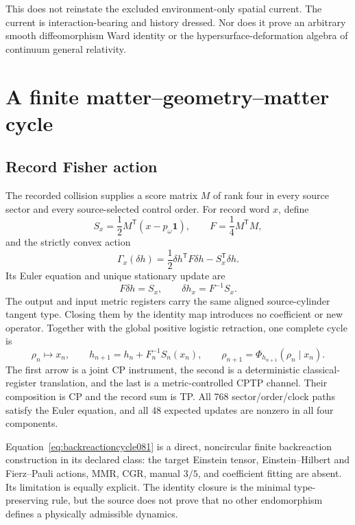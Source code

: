 \documentclass[11pt]{article}
\theoremstyle{definition}
\theoremstyle{remark}
\begin{document}
This does not reinstate the excluded environment-only spatial current. The current is interaction-bearing and history dressed. Nor does it prove an arbitrary smooth diffeomorphism Ward identity or the hypersurface-deformation algebra of continuum general relativity.

\section{A finite matter--geometry--matter cycle}\label{sec:finitebackreaction081}

\subsection{Record Fisher action}

The recorded collision supplies a score matrix $M$ of rank four in every source sector and every source-selected control order. For record word $x$, define
\begin{equation}
 S_x=\frac12M^{\mathsf T}(x-p_\omega\mathbf 1),
 \qquad
 F=\frac14M^{\mathsf T}M,
\end{equation}
and the strictly convex action
\begin{equation}\label{eq:fisheraction081}
 \Gamma_x(\delta h)
 =\frac12\delta h^{\mathsf T}F\delta h-S_x^{\mathsf T}\delta h.
\end{equation}
Its Euler equation and unique stationary update are
\begin{equation}\label{eq:fisherupdate081}
 F\delta h=S_x,
 \qquad
 \delta h_x=F^{-1}S_x.
\end{equation}
The output and input metric registers carry the same aligned source-cylinder tangent type. Closing them by the identity map introduces no coefficient or new operator. Together with the global positive logistic retraction, one complete cycle is
\begin{equation}\label{eq:backreactioncycle081}
 \rho_n\longmapsto x_n,
 \qquad
 h_{n+1}=h_n+F_n^{-1}S_n(x_n),
 \qquad
 \rho_{n+1}=\Phi_{h_{n+1}}(\rho_n\mid x_n).
\end{equation}
The first arrow is a joint CP instrument, the second is a deterministic classical-register translation, and the last is a metric-controlled CPTP channel. Their composition is CP and the record sum is TP. All 768 sector/order/clock paths satisfy the Euler equation, and all 48 expected updates are nonzero in all four components.

Equation~\eqref{eq:backreactioncycle081} is a direct, noncircular finite backreaction construction in its declared class: the target Einstein tensor, Einstein--Hilbert and Fierz--Pauli actions, MMR, CGR, manual $3/5$, and coefficient fitting are absent. Its limitation is equally explicit. The identity closure is the minimal type-preserving rule, but the source does not prove that no other endomorphism defines a physically admissible dynamics.
\end{document}
